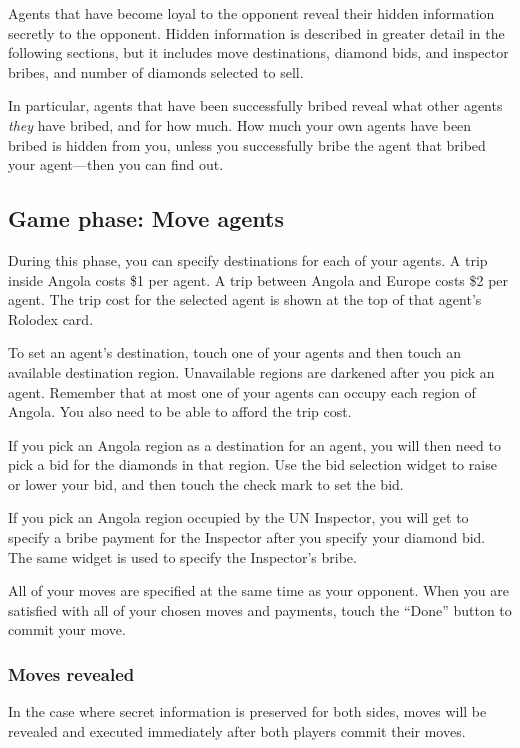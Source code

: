 \documentclass[8pt]{extbook}
\begin{document}
Agents that have become loyal to the opponent reveal their hidden information secretly to the opponent.  Hidden information is described in greater detail in the following sections, but it includes move destinations, diamond bids, and inspector bribes, and number of diamonds selected to sell.

In particular, agents that have been successfully bribed reveal what other agents {\it they} have bribed, and for how much.  How much your own agents have been bribed is hidden from you, unless you successfully bribe the agent that bribed your agent---then you can find out.

\subsection{Game phase:  Move agents}

During this phase, you can specify destinations for each of your agents.  A trip inside Angola costs \$1 per agent.  A trip between Angola and Europe costs \$2 per agent.  The trip cost for the selected agent is shown at the top of that agent's Rolodex card.

To set an agent's destination, touch one of your agents and then touch an available destination region.  Unavailable regions are darkened after you pick an agent.  Remember that at most one of your agents can occupy each region of Angola.  You also need to be able to afford the trip cost.

If you pick an Angola region as a destination for an agent, you will then need to pick a bid for the diamonds in that region.  Use the bid selection widget to raise or lower your bid, and then touch the check mark to set the bid.

If you pick an Angola region occupied by the UN Inspector, you will get to specify a bribe payment for the Inspector after you specify your diamond bid.  The same widget is used to specify the Inspector's bribe.

All of your moves are specified at the same time as your opponent.  When you are satisfied with all of your chosen moves and payments, touch the ``Done'' button to commit your move.

\subsubsection{Moves revealed}
In the case where secret information is preserved for both sides, moves will be revealed and executed immediately after both players commit their moves.
\end{document}

